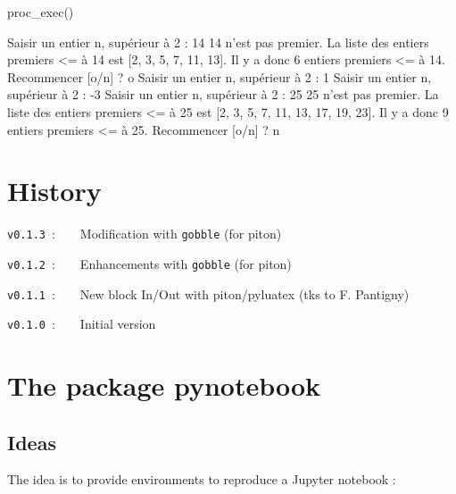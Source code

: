 \documentclass[english,11pt,a4paper]{article}
\begin{document}
\begin{NotebookIn}{\linewidth}
proc_exec()
\end{NotebookIn}

\begin{NotebookConsole}{\linewidth}
Saisir un entier n, supérieur à 2 : 14
14 n'est pas premier.
La liste des entiers premiers <= à 14 est [2, 3, 5, 7, 11, 13].
Il y a donc 6 entiers premiers <= à 14.
Recommencer [o/n] ? o
Saisir un entier n, supérieur à 2 : 1
Saisir un entier n, supérieur à 2 : -3
Saisir un entier n, supérieur à 2 : 25
25 n'est pas premier.
La liste des entiers premiers <= à 25 est [2, 3, 5, 7, 11, 13, 17, 19, 23].
Il y a donc 9 entiers premiers <= à 25.
Recommencer [o/n] ? n
\end{NotebookConsole}
%
%

\pagebreak

\section{History}

\verb|v0.1.3|~:~~~~Modification with \texttt{gobble} (for \textsf{piton})

\verb|v0.1.2|~:~~~~Enhancements with \texttt{gobble} (for \textsf{piton})

\verb|v0.1.1|~:~~~~New block \textsf{In/Out} with \textsf{piton/pyluatex} (tks to F. Pantigny)

\verb|v0.1.0|~:~~~~Initial version

\vspace*{15mm}

\pagebreak

\section{The package pynotebook}

\subsection{Ideas}

The idea is to provide environments to reproduce a Jupyter notebook :
\end{document}

